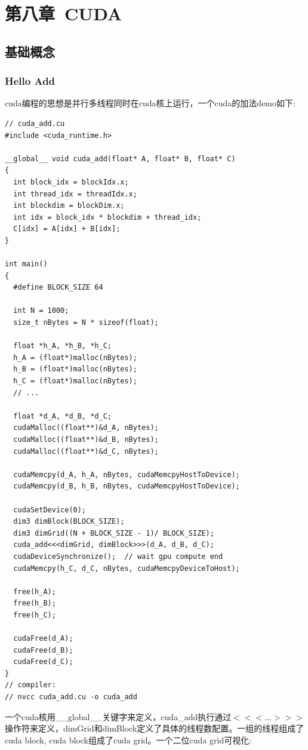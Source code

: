 \documentclass[12pt]{book}
\begin{document}
\newpage

\fancyhead{}

\chapter{第八章\ CUDA}
\section{基础概念}
\subsection{Hello Add}
cuda编程的思想是并行多线程同时在cuda核上运行，一个cuda的加法demo如下:
\begin{lstlisting}
// cuda_add.cu
#include <cuda_runtime.h>

__global__ void cuda_add(float* A, float* B, float* C)
{
  int block_idx = blockIdx.x;
  int thread_idx = threadIdx.x;
  int blockdim = blockDim.x;
  int idx = block_idx * blockdim + thread_idx;
  C[idx] = A[idx] + B[idx];
}

int main()
{
  #define BLOCK_SIZE 64
  
  int N = 1000;
  size_t nBytes = N * sizeof(float);

  float *h_A, *h_B, *h_C;
  h_A = (float*)malloc(nBytes);
  h_B = (float*)malloc(nBytes);
  h_C = (float*)malloc(nBytes);
  // ...
  
  float *d_A, *d_B, *d_C;
  cudaMalloc((float**)&d_A, nBytes);
  cudaMalloc((float**)&d_B, nBytes);
  cudaMalloc((float**)&d_C, nBytes);
  
  cudaMemcpy(d_A, h_A, nBytes, cudaMemcpyHostToDevice);
  cudaMemcpy(d_B, h_B, nBytes, cudaMemcpyHostToDevice);
  
  cudaSetDevice(0);
  dim3 dimBlock(BLOCK_SIZE);
  dim3 dimGrid((N + BLOCK_SIZE - 1)/ BLOCK_SIZE);
  cuda_add<<<dimGrid, dimBlock>>>(d_A, d_B, d_C);
  cudaDeviceSynchronize();  // wait gpu compute end
  cudaMemcpy(h_C, d_C, nBytes, cudaMemcpyDeviceToHost);

  free(h_A);
  free(h_B);
  free(h_C);

  cudaFree(d_A);
  cudaFree(d_B);
  cudaFree(d_C);
}
// compiler:
// nvcc cuda_add.cu -o cuda_add
\end{lstlisting}
一个cuda核用\_\_global\_\_关键字来定义，cuda\_add执行通过$<<<...>>>$操作符来定义，dimGrid和dimBlock定义了具体的线程数配置。一组的线程组成了cuda block, cuda block组成了cuda grid。一个二位cuda grid可视化:
\end{document}
